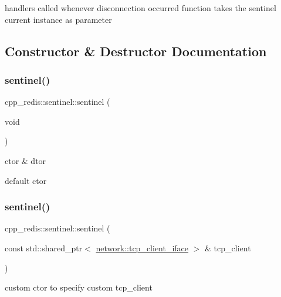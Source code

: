 handlers called whenever disconnection occurred function takes the sentinel current instance as parameter 

\subsection{Constructor \& Destructor Documentation}
\mbox{\label{classcpp__redis_1_1sentinel_a2ea5a80a9139d5192706988521a2ae34}} 
\subsubsection{\texorpdfstring{sentinel()}{sentinel()}\hspace{0.1cm}{\footnotesize\ttfamily [1/2]}}
{\footnotesize\ttfamily cpp\+\_\+redis\+::sentinel\+::sentinel (\begin{DoxyParamCaption}\item[{void}]{ }\end{DoxyParamCaption})}



ctor \& dtor 

default ctor \mbox{\label{classcpp__redis_1_1sentinel_af53665f5834dfe5861a6310318ae5169}} 
\subsubsection{\texorpdfstring{sentinel()}{sentinel()}\hspace{0.1cm}{\footnotesize\ttfamily [2/2]}}
{\footnotesize\ttfamily cpp\+\_\+redis\+::sentinel\+::sentinel (\begin{DoxyParamCaption}\item[{const std\+::shared\+\_\+ptr$<$ \hyperlink{classcpp__redis_1_1network_1_1tcp__client__iface}{network\+::tcp\+\_\+client\+\_\+iface} $>$ \&}]{tcp\+\_\+client }\end{DoxyParamCaption})\hspace{0.3cm}{\ttfamily [explicit]}}

custom ctor to specify custom tcp\+\_\+client


